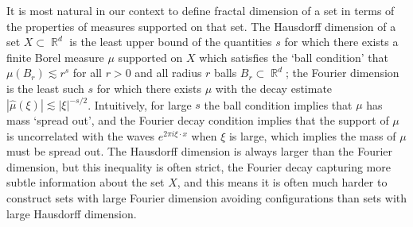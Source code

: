\documentclass[11pt]{article}
\DeclareMathOperator{\RR}{\mathbb{R}}
\begin{document}

It is most natural in our context to define fractal dimension of a set in terms of the properties of measures supported on that set. The Hausdorff dimension of a set $X \subset \RR^d$ is the least upper bound of the quantities $s$ for which there exists a finite Borel measure $\mu$ supported on $X$ which satisfies the `ball condition' that $\mu(B_r) \lesssim r^s$ for all $r > 0$ and all radius $r$ balls $B_r \subset \RR^d$; the Fourier dimension is the least such $s$ for which there exists $\mu$ with the decay estimate $|\widehat{\mu}(\xi)| \lesssim |\xi|^{-s/2}$. Intuitively, for large $s$ the ball condition implies that $\mu$ has mass `spread out', and the Fourier decay condition implies that the support of $\mu$ is uncorrelated with the waves $e^{2 \pi i \xi \cdot x}$ when $\xi$ is large, which implies the mass of $\mu$ must be spread out. The Hausdorff dimension is always larger than the Fourier dimension, but this inequality is often strict, the Fourier decay capturing more subtle information about the set $X$, and this means it is often much harder to construct sets with large Fourier dimension avoiding configurations than sets with large Hausdorff dimension.
\end{document}
